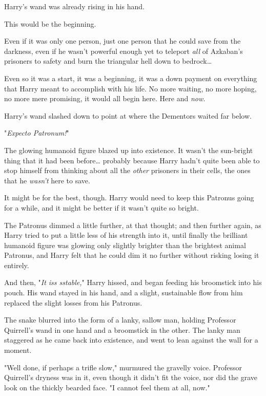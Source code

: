 Harry's wand was already rising in his hand.

This would be the beginning.

Even if it was only one person, just one person that he could save from the 
darkness, even if he wasn't powerful enough yet to teleport \emph{all} of 
Azkaban's prisoners to safety and burn the triangular hell down to 
bedrock{\ldots}

Even so it was a start, it was a beginning, it was a down payment on everything 
that Harry meant to accomplish with his life. No more waiting, no more hoping, 
no more mere promising, it would all begin here. Here and \emph{now.}

Harry's wand slashed down to point at where the Dementors waited far below.

"\emph{Expecto Patronum!}"

The glowing humanoid figure blazed up into existence. It wasn't the sun-bright 
thing that it had been before{\ldots} probably because Harry hadn't quite been 
able to stop himself from thinking about all the \emph{other} prisoners in 
their cells, the ones that he \emph{wasn't} here to save.

It might be for the best, though. Harry would need to keep this Patronus going 
for a while, and it might be better if it wasn't quite so bright.

The Patronus dimmed a little further, at that thought; and then further again, 
as Harry tried to put a little less of his strength into it, until finally the 
brilliant humanoid figure was glowing only slightly brighter than the brightest 
animal Patronus, and Harry felt that he could dim it no further without risking 
losing it entirely.

And then, "\emph{It iss sstable,}" Harry hissed, and began feeding his 
broomstick into his pouch. His wand stayed in his hand, and a slight, 
sustainable flow from him replaced the slight losses from his Patronus.

The snake blurred into the form of a lanky, sallow man, holding Professor 
Quirrell's wand in one hand and a broomstick in the other. The lanky man 
staggered as he came back into existence, and went to lean against the wall for 
a moment.

"Well done, if perhaps a trifle slow," murmured the gravelly voice. Professor 
Quirrell's dryness was in it, even though it didn't fit the voice, nor did the 
grave look on the thickly bearded face. "I cannot feel them at all, now."

